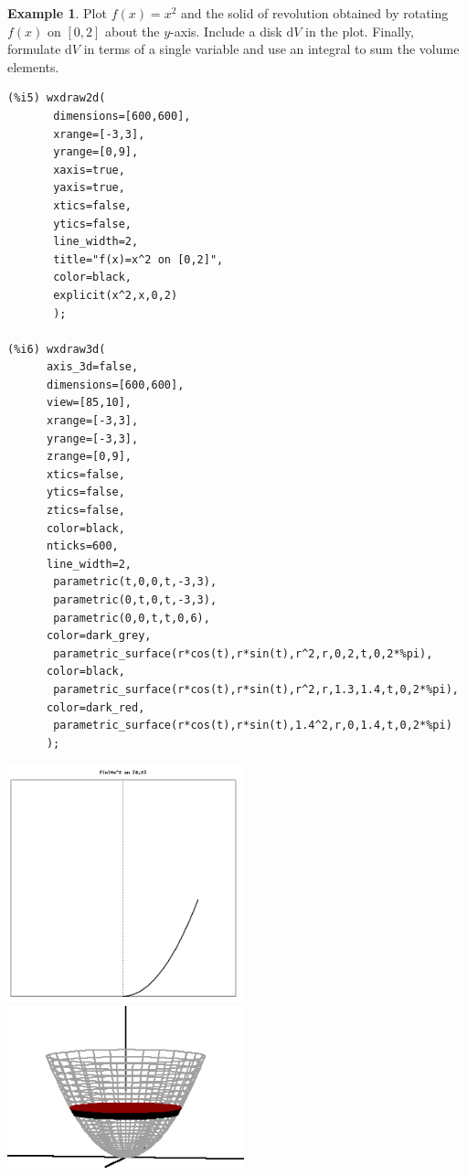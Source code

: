 \documentclass[10.5pt,twoside]{report}
\theoremstyle{definition}
\newtheorem{exmp}{Example}[section]
\begin{document}
\begin{exmp} Plot $f(x)=x^2$ and the solid of revolution obtained by rotating $f(x)$ on $[0,2]$ about the $y$-axis.  Include a disk $\mathrm{d}V$ in the plot.  Finally, formulate $\mathrm{d}V$ in terms of a single variable and use an integral to sum the volume elements.

\begin{verbatim}
(%i5) wxdraw2d(
       dimensions=[600,600],
       xrange=[-3,3],
       yrange=[0,9],
       xaxis=true,
       yaxis=true,
       xtics=false,
       ytics=false,
       line_width=2,
       title="f(x)=x^2 on [0,2]",
       color=black,
       explicit(x^2,x,0,2)
       );

(%i6) wxdraw3d(  
      axis_3d=false,
      dimensions=[600,600],
      view=[85,10],
      xrange=[-3,3],
      yrange=[-3,3],
      zrange=[0,9],
      xtics=false,
      ytics=false,
      ztics=false,
      color=black,
      nticks=600,
      line_width=2,
       parametric(t,0,0,t,-3,3),
       parametric(0,t,0,t,-3,3),
       parametric(0,0,t,t,0,6), 
      color=dark_grey,
       parametric_surface(r*cos(t),r*sin(t),r^2,r,0,2,t,0,2*%pi),
      color=black,
       parametric_surface(r*cos(t),r*sin(t),r^2,r,1.3,1.4,t,0,2*%pi),
      color=dark_red,
       parametric_surface(r*cos(t),r*sin(t),1.4^2,r,0,1.4,t,0,2*%pi)
      );
\end{verbatim}

\includegraphics[width=2.7in]{example_3_2_2_1}
\includegraphics[width=2.7in]{example_3_2_2_2}



\end{exmp}
\end{document}
